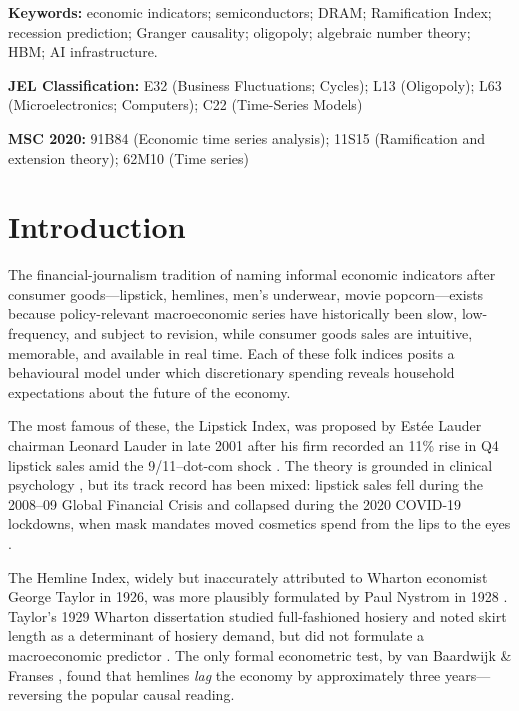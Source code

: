 \documentclass[12pt]{article}
\theoremstyle{definition}
\begin{document}
\noindent\textbf{Keywords:} economic indicators; semiconductors; DRAM; Ramification Index; recession prediction; Granger causality; oligopoly; algebraic number theory; HBM; AI infrastructure.

\vspace{6pt}
\noindent\textbf{JEL Classification:} E32 (Business Fluctuations; Cycles); L13 (Oligopoly); L63 (Microelectronics; Computers); C22 (Time-Series Models)

\vspace{6pt}
\noindent\textbf{MSC 2020:} 91B84 (Economic time series analysis); 11S15 (Ramification and extension theory); 62M10 (Time series)

\tableofcontents

\section{Introduction}
\label{sec:intro}

The financial-journalism tradition of naming informal economic indicators after consumer goods---lipstick, hemlines, men's underwear, movie popcorn---exists because policy-relevant macroeconomic series have historically been slow, low-frequency, and subject to revision, while consumer goods sales are intuitive, memorable, and available in real time. Each of these folk indices posits a behavioural model under which discretionary spending reveals household expectations about the future of the economy.

The most famous of these, the Lipstick Index, was proposed by Est\'{e}e Lauder chairman Leonard Lauder in late 2001 after his firm recorded an 11\% rise in Q4 lipstick sales amid the 9/11--dot-com shock \cite{Nelson2001}. The theory is grounded in clinical psychology \cite{Hill2012}, but its track record has been mixed: lipstick sales fell during the 2008--09 Global Financial Crisis and collapsed during the 2020 COVID-19 lockdowns, when mask mandates moved cosmetics spend from the lips to the eyes \cite{Scott2020,Bryan2022}.

The Hemline Index, widely but inaccurately attributed to Wharton economist George Taylor in 1926, was more plausibly formulated by Paul Nystrom in 1928 \cite{Nystrom1928}. Taylor's 1929 Wharton dissertation studied full-fashioned hosiery and noted skirt length as a determinant of hosiery demand, but did not formulate a macroeconomic predictor \cite{Taylor1929}. The only formal econometric test, by van Baardwijk \& Franses \cite{vanBaardwijk2010}, found that hemlines \emph{lag} the economy by approximately three years---reversing the popular causal reading.
\end{document}
